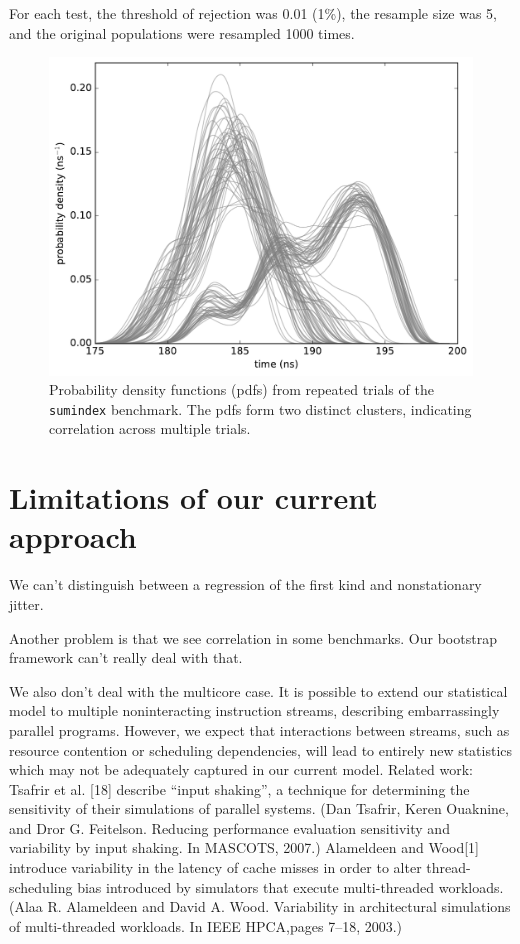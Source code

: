 \documentclass[conference]{IEEEtran}
\begin{document}
For each test, the threshold of rejection was 0.01 (1\%), the resample size was 5, and the original populations were resampled 1000 times.

\begin{figure}[!t]
\centering
\includegraphics[width=\columnwidth]{figures/fig4/kde_pdf_sumindex}
\caption{Probability density functions (pdfs) from repeated trials of the
\lstinline|sumindex| benchmark. The pdfs form two distinct clusters, indicating
correlation across multiple trials.}
\label{fig:pdfsumindex}
\end{figure}

\section{Limitations of our current approach}

We can't distinguish between a regression of the first kind and nonstationary jitter.

Another problem is that we see correlation in some benchmarks. Our bootstrap framework can't really deal with that.

We also don't deal with the multicore case. It is possible to extend our statistical
model to multiple noninteracting instruction streams, describing embarrassingly
parallel programs. However, we expect that interactions between streams, such as
resource contention or scheduling dependencies, will lead to entirely new
statistics which may not be adequately captured in our current model.
Related work:
Tsafrir et al. [18] describe “input shaking”, a technique for determining the sensitivity of their simulations of parallel systems. (Dan Tsafrir, Keren Ouaknine, and Dror G. Feitelson. Reducing performance evaluation sensitivity and variability by input shaking. In MASCOTS, 2007.)
Alameldeen and Wood[1] introduce variability in the latency of cache misses in order to alter thread-scheduling bias introduced by simulators that execute multi-threaded workloads. (Alaa R. Alameldeen and David A. Wood. Variability in architectural simulations of multi-threaded workloads. In IEEE HPCA,pages 7–18, 2003.)
\end{document}
